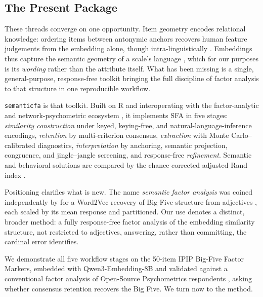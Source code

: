 \subsection{The Present Package}

These threads converge on one opportunity. Item geometry encodes relational
knowledge: ordering items between antonymic anchors recovers human feature
judgements from the embedding alone, though intra-linguistically
\citep{grand-etal-2022}. Embeddings thus capture the semantic geometry of a scale's
language \citep{westbury-preprint}, which for our purposes is its \emph{wording}
rather than the attribute itself. What has been missing
is a single, general-purpose, response-free toolkit bringing the full discipline of
factor analysis to that structure in one reproducible workflow.

\texttt{semanticfa} \citep{yanitski-westbury-2026} is that toolkit. Built on R
\citep{rcoreteam-2025} and interoperating with the factor-analytic and
network-psychometric ecosystem \citep{revelle-2026, golino-christensen-2026}, it
implements SFA in five stages: \emph{similarity construction} under keyed,
keying-free, and natural-language-inference encodings, \emph{retention} by
multi-criterion consensus, \emph{extraction} with Monte Carlo--calibrated
diagnostics, \emph{interpretation} by anchoring, semantic projection, congruence,
and jingle--jangle screening, and response-free \emph{refinement}. Semantic and
behavioral solutions are compared by the chance-corrected adjusted Rand index
\citep{hubert-arabie-1985}.

Positioning clarifies what is new. The name \emph{semantic factor analysis} was
coined independently by \citet{muller-2026} for a Word2Vec recovery of Big-Five
structure from adjectives \citep{mikolov-etal-2013, goldberg-1990}, each scaled by
its mean response and partitioned. Our use denotes a distinct, broader method: a
fully response-free factor analysis of the embedding similarity structure, not
restricted to adjectives, answering, rather than committing, the cardinal error
\citet{uher-2025} identifies.

We demonstrate all five workflow stages on the 50-item IPIP Big-Five Factor Markers,
embedded with Qwen3-Embedding-8B \citep{qwen-2025} and validated against a
conventional factor analysis of \valNHuman{} Open-Source Psychometrics respondents
\citep{openpsychometrics-2018}, asking whether consensus retention recovers the Big
Five. We turn now to the method.
